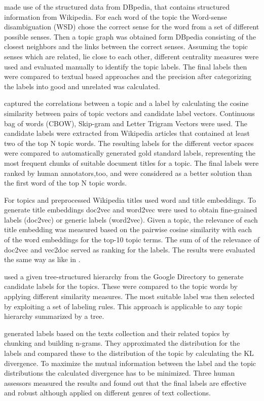\textit{\cite{Hulpus2013}} made use of the structured data from DBpedia, that contains structured information from Wikipedia. For each word of the topic the Word-sense disambiguation (WSD) chose the correct sense for the word from a set of different possible senses. Then a topic graph was obtained form DBpedia consisting of the closest neighbors and the links between the correct senses. Assuming the topic senses which are related, lie close to each other, different centrality measures were used and evaluated manually to identify the topic labels. The final labels then were compared to textual based approaches and the precision after categorizing the labels into good and unrelated was calculated.

\cite{Kou2015} captured the correlations between a topic and a label by calculating the cosine similarity between pairs of topic vectors and candidate label vectors. Continuous bag of words (CBOW), Skip-gram and Letter Trigram Vectors were used. The candidate labels were extracted from Wikipedia articles that contained at least two of the top N topic words. The resulting labels for the different vector spaces were compared to automatically generated gold standard labels, representing the most frequent chunks of suitable document titles for a topic. The final labels were ranked by human annotators,too, and were considered as a better solution than the first word of the top N topic words. 

For topics and preprocessed Wikipedia titles \textit{\cite{Bhatia2016}} used word and title embeddings. To generate title embeddings doc2vec and word2vec were used to obtain fine-grained labels (doc2vec) or generic labels (word2vec). Given a topic, the relevance of each title embedding was measured based on the pairwise cosine similarity with each of the word embeddings for the top-10 topic terms. The sum of of the relevance of doc2vec and vec2doc served as ranking for the labels. The results were evaluated the same way as like in \cite{Lau2011}.

\textit{\cite{Magatti2009}} used a given tree-structured hierarchy from the Google Directory to generate candidate labels for the topics. These were compared to the topic words by applying different similarity measures. The most suitable label was then selected by exploiting a set of labeling
rules. This approach is applicable to any topic hierarchy summarized by a tree.

\textit{\cite{Mei2007}} generated labels based on the texts collection and their related topics by chunking and building n-grams. They approximated the distribution for the labels and compared these to the distribution of the topic by calculating the \ac{KL} divergence. To maximize the mutual information between the label and the topic distributions the calculated divergence has to be minimized. Three human assessors measured the results and found out that the final labels are effective and robust although applied on different genres of text collections. 


